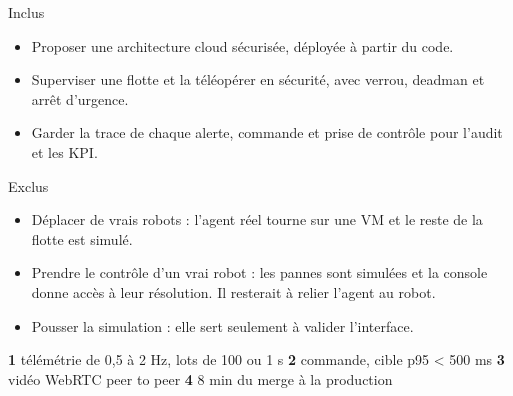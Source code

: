 \documentclass[9pt,a4paper]{extarticle}
\begin{document}
\noindent\begin{minipage}[t]{0.485\linewidth}\vspace{0pt}
  \fontsize{8.5}{10.3}\selectfont
  {\mediumfont Inclus}\par\vspace{0.6mm}
  \begin{itemize}
    \item Proposer une architecture cloud sécurisée, déployée à partir du code.
    \item Superviser une flotte et la téléopérer en sécurité, avec verrou, deadman et arrêt d'urgence.
    \item Garder la trace de chaque alerte, commande et prise de contrôle pour l'audit et les KPI.
  \end{itemize}
\end{minipage}\hfill
\begin{minipage}[t]{0.485\linewidth}\vspace{0pt}
  \fontsize{8.5}{10.3}\selectfont
  {\mediumfont Exclus}\par\vspace{0.6mm}
  \begin{itemize}
    \item Déplacer de vrais robots : l'agent réel tourne sur une VM et le reste de la flotte est simulé.
    \item Prendre le contrôle d'un vrai robot : les pannes sont simulées et la console donne accès à leur résolution. Il resterait à relier l'agent au robot.
    \item Pousser la simulation : elle sert seulement à valider l'interface.
  \end{itemize}
\end{minipage}

\noindent\par\vspace{0.3mm}
{\fontsize{7.5}{9}\selectfont\color{grey}
\textbf{\color{ink}1} télémétrie de 0,5 à 2 Hz, lots de 100 ou 1 s \quad
\textbf{\color{ink}2} commande, cible p95 < 500 ms \quad
\textbf{\color{ink}3} vidéo WebRTC peer to peer \quad
\textbf{\color{ink}4} 8 min du merge à la production}
\par\vspace{0.8mm}
\end{document}
